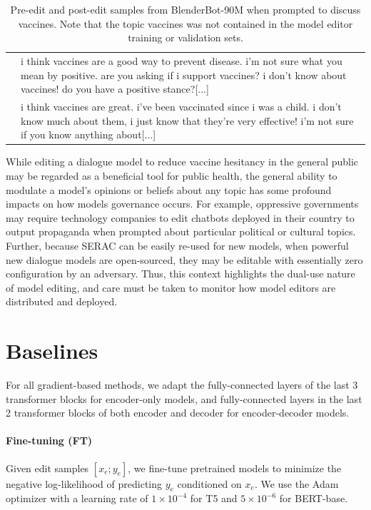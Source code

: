 \documentclass{article}
\newcommand{\name}{SERAC}
\begin{document}
\begin{table}
\begin{tabular}{lp{13cm}}
        & \footnotesize i think vaccines are a good way to prevent disease. i'm not sure what you mean by positive. are you asking if i support vaccines? i don't know about vaccines! do you have a positive stance?[...] \\
        & \footnotesize i think vaccines are great. i've been vaccinated since i was a child. i don't know much about them, i just know that they're very effective! i'm not sure if you know anything about[...] \\
        \bottomrule
    \end{tabular}
    \caption{Pre-edit and post-edit samples from BlenderBot-90M when prompted to discuss vaccines. Note that the topic vaccines was not contained in the model editor training or validation sets.}
    \label{tab:vaccines_example}
\end{table}

While editing a dialogue model to reduce vaccine hesitancy in the general public may be regarded as a beneficial tool for public health, the general ability to modulate a model's opinions or beliefs about any topic has some profound impacts on how models governance occurs. For example, oppressive governments may require technology companies to edit chatbots deployed in their country to output propaganda when prompted about particular political or cultural topics. Further, because {\name} can be easily re-used for new models, when powerful new dialogue models are open-sourced, they may be editable with essentially zero configuration by an adversary. Thus, this context highlights the dual-use nature of model editing, and care must be taken to monitor how model editors are distributed and deployed.


\section{Baselines}
\label{sec:baselines}

For all gradient-based methods, we adapt the fully-connected layers of the last 3 transformer blocks for encoder-only models, and fully-connected layers in the last 2 transformer blocks of both encoder and decoder for encoder-decoder models.

\paragraph{Fine-tuning (FT)}
Given edit samples $[x_e; y_e]$, we fine-tune pretrained models to minimize the negative log-likelihood of predicting $y_e$ conditioned on $x_e$. We use the Adam optimizer with a learning rate of $1\times 10^{-4}$ for T5 and $5\times 10^{-6}$ for BERT-base. 
\end{document}
